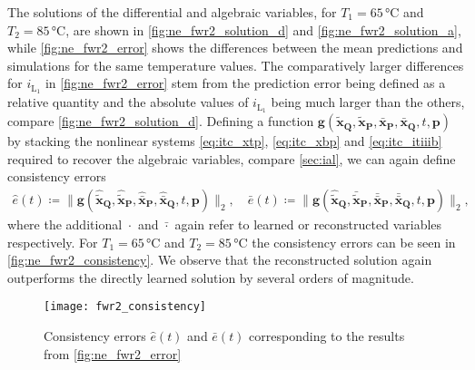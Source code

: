 \documentclass[AMA,STIX1COL]{WileyNJD-v2}
\newcommand{\mb}[1]{\mathbf{#1}}
\newcommand{\mbt}[1]{\tilde{\mathbf{#1}}}
\newcommand{\mbb}[1]{\bar{\mathbf{#1}}}
\newcommand{\mr}[1]{\mathrm{#1}}
\begin{document}
The solutions of the differential and algebraic variables, for $T_1 = 65\, \si{\celsius}$ and $T_2 = 85\, \si{\celsius}$, are shown in \autoref{fig:ne_fwr2_solution_d} and \autoref{fig:ne_fwr2_solution_a}, while \autoref{fig:ne_fwr2_error} shows the differences between the mean predictions and simulations for the same temperature values. The comparatively larger differences for $i_{\mr{L}_1}$ in \autoref{fig:ne_fwr2_error} stem from the prediction error being defined as a relative quantity and the absolute values of $i_{\mr{L}_1}$ being much larger than the others, compare \autoref{fig:ne_fwr2_solution_d}. Defining a function $\mb{g}(\mbt{x}_\mb{Q}, \mbt{x}_\mb{P}, \mbb{x}_\mb{P}, \mbb{x}_\mb{Q}, t, \mb{p})$ by stacking the nonlinear systems \eqref{eq:itc_xtp}, \eqref{eq:itc_xbp} and \eqref{eq:itc_itiiib} required to recover the algebraic variables, compare \autoref{sec:ial}, we can again define consistency errors
\begin{align*}
    \hat{e}(t) \coloneqq \big\| \mb{g}(\hat{\mbt{x}}_\mb{Q}, \hat{\mbt{x}}_\mb{P}, \hat{\mbb{x}}_\mb{P}, \hat{\mbb{x}}_\mb{Q}, t, \mb{p}) \big\|_2, \quad \bar{e}(t) \coloneqq \big\| \mb{g}(\hat{\mbt{x}}_\mb{Q}, \bar{\mbt{x}}_\mb{P}, \bar{\mbb{x}}_\mb{P}, \bar{\mbb{x}}_\mb{Q}, t, \mb{p}) \big\|_2,
\end{align*}
where the additional $\hat{\cdot}$ and $\bar{\cdot}$ again refer to learned or reconstructed variables respectively. For $T_1 = 65\, \si{\celsius}$ and $T_2 = 85\, \si{\celsius}$ the consistency errors can be seen in \autoref{fig:ne_fwr2_consistency}. We observe that the reconstructed solution again outperforms the directly learned solution by several orders of magnitude.
\begin{figure}
    \begin{center}
        \texttt{[image: fwr2\_consistency]}
    \end{center}
    \caption{Consistency errors $\hat{e}(t)$ and $\bar{e}(t)$ corresponding to the results from \autoref{fig:ne_fwr2_error}}
    \label{fig:ne_fwr2_consistency}
\end{figure}
\end{document}
